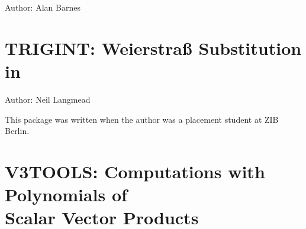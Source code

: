 Author: Alan Barnes



\newpage

\section{TRIGINT: Weierstra\ss{} Substitution in \REDUCE}

Author: Neil Langmead

This package was written when the author was a placement student at ZIB Berlin.



\iffalse
\newpage

\section{TRIGSIMP: Simplification and Factorization of Trigonometric
and Hyperbolic Functions}
\indexpackage{TRIGSIMP}

\label{TRIGSIMP}

Author: Wolfram Koepf



\fi

\newpage

\section[V3TOOLS: Computations with Polynomials of Scalar Vector Products]{V3TOOLS: Computations with Polynomials of\\Scalar Vector Products}


